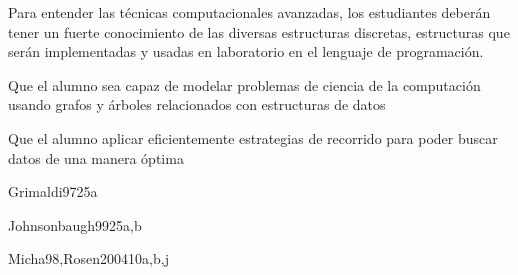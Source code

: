 \begin{syllabus}


\begin{justification}
Para entender las técnicas computacionales avanzadas, los estudiantes deberán tener un fuerte conocimiento de las
diversas estructuras discretas, estructuras que serán implementadas y usadas en laboratorio en el lenguaje de programación.
\end{justification}

\begin{goals}
\item Que el alumno sea capaz de modelar problemas de ciencia de la computación usando grafos y árboles relacionados con estructuras de datos
\item Que el alumno aplicar eficientemente estrategias de recorrido para poder buscar datos de una manera óptima
\end{goals}


\begin{unit}{\DSBasicCountingDef}{}{Grimaldi97}{25}{a}
   \DSBasicCountingAllTopics
   \DSBasicCountingAllObjectives
\end{unit}

\begin{unit}{\DSGraphsAndTreesDef}{}{Johnsonbaugh99}{25}{a,b}
   \DSGraphsAndTreesAllTopics
   \DSGraphsAndTreesAllObjectives
\end{unit}

\begin{unit}{\DSDiscreteProbabilityDef}{}{Micha98,Rosen2004}{10}{a,b,j}
   \DSDiscreteProbabilityAllTopics
   \DSDiscreteProbabilityAllObjectives
\end{unit}

\begin{coursebibliography}
\end{coursebibliography}

\end{syllabus}

%
